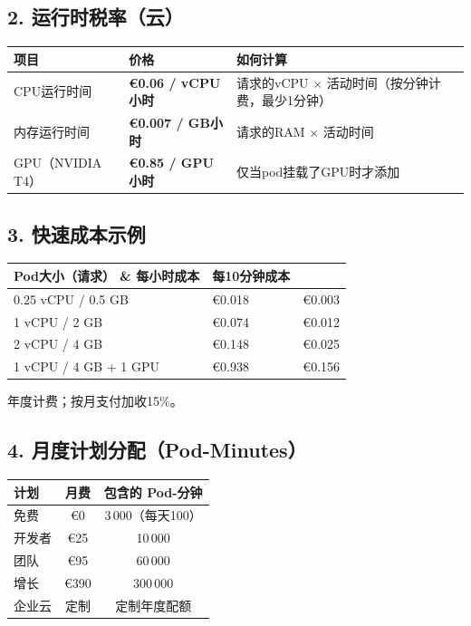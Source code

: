 \documentclass[11pt, a4paper, oneside]{article}
\begin{document}
\subsection*{2. 运行时税率（云）}
\begin{center}
\begin{tabular}{@{}p{4cm}p{4cm}p{6cm}@{}}
\toprule
\textbf{项目} & \textbf{价格} & \textbf{如何计算} \\
\midrule
CPU运行时间 & \textbf{€0.06 / vCPU小时} & 请求的vCPU $\times$ 活动时间（按分钟计费，最少1分钟） \\
内存运行时间 & \textbf{€0.007 / GB小时} & 请求的RAM $\times$ 活动时间 \\
GPU（NVIDIA T4） & \textbf{€0.85 / GPU小时} & 仅当pod挂载了GPU时才添加 \\
\bottomrule
\end{tabular}
\end{center}

\subsection*{3. 快速成本示例}
\begin{center}
\begin{tabular}{@{}lll@{}}
\toprule
\textbf{Pod大小（请求）} \& \textbf{每小时成本} & \textbf{每10分钟成本} \\



\midrule
0.25 vCPU / 0.5 GB & €0.018 & €0.003 \\
1 vCPU / 2 GB & €0.074 & €0.012 \\
2 vCPU / 4 GB & €0.148 & €0.025 \\
1 vCPU / 4 GB + 1 GPU & €0.938 & €0.156 \\
\bottomrule
\end{tabular}
\end{center}

\smallskip
\noindent *年度计费；按月支付加收15\%。

\subsection*{4. 月度计划分配（Pod-Minutes）}
\begin{center}
\begin{tabular}{@{}lcc@{}}
\toprule
\textbf{计划} & \textbf{月费} & \textbf{包含的 Pod-分钟} \\
\midrule
免费        & €0    & 3\,000（每天100） \\
开发者      & €25   & 10\,000 \\
团队        & €95   & 60\,000 \\
增长        & €390  & 300\,000 \\
企业云      & 定制  & 定制年度配额 \\
\bottomrule
\end{tabular}
\end{center}
\end{document}
